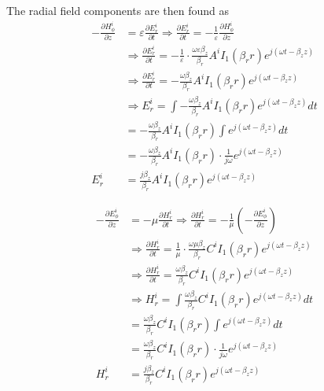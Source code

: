 The radial field components are then found as
\begin{equation}
	\begin{split}
		- \frac{\partial H_\phi^i}{\partial z} &= \varepsilon \frac{\partial E_r^i}{\partial t} 
		\Rightarrow \frac{\partial E_r^i}{\partial t} = -\frac{1}{\varepsilon} \frac{\partial H_\phi^i}{\partial z} \\
		&\Rightarrow \frac{\partial E_r^i}{\partial t} = -\frac{1}{\varepsilon} \cdot \frac{\omega \varepsilon \beta_z}{\beta_r} A^i I_1(\beta_r r) e^{j(\omega t - \beta_z z)} \\
		&\Rightarrow \frac{\partial E_r^i}{\partial t} = -\frac{\omega \beta_z}{\beta_r} A^i I_1(\beta_r r) e^{j(\omega t - \beta_z z)} \\
		&\Rightarrow E_r^i = \int -\frac{\omega \beta_z}{\beta_r} A^i I_1(\beta_r r) e^{j(\omega t - \beta_z z)} dt \\
		&= -\frac{\omega \beta_z}{\beta_r} A^i I_1(\beta_r r) \int e^{j(\omega t - \beta_z z)} dt \\
		&= -\frac{\omega \beta_z}{\beta_r} A^i I_1(\beta_r r) \cdot \frac{1}{j\omega} e^{j(\omega t - \beta_z z)} \\
		E_r^i &= \frac{j \beta_z}{\beta_r} A^i I_1(\beta_r r) e^{j(\omega t - \beta_z z)}
	\end{split}
	\label{eq:Er_i}
\end{equation}

\begin{equation}
	\begin{split}
		- \frac{\partial E_\phi^i}{\partial z} &= -\mu \frac{\partial H_r^i}{\partial t} 
		\Rightarrow \frac{\partial H_r^i}{\partial t} = -\frac{1}{\mu} \left( -\frac{\partial E_\phi^i}{\partial z} \right) \\
		&\Rightarrow \frac{\partial H_r^i}{\partial t} = \frac{1}{\mu} \cdot \frac{\omega \mu \beta_z}{\beta_r} C^i I_1(\beta_r r) e^{j(\omega t - \beta_z z)} \\
		&\Rightarrow \frac{\partial H_r^i}{\partial t} = \frac{\omega \beta_z}{\beta_r} C^i I_1(\beta_r r) e^{j(\omega t - \beta_z z)} \\
		&\Rightarrow H_r^i = \int \frac{\omega \beta_z}{\beta_r} C^i I_1(\beta_r r) e^{j(\omega t - \beta_z z)} dt \\
		&= \frac{\omega \beta_z}{\beta_r} C^i I_1(\beta_r r) \int e^{j(\omega t - \beta_z z)} dt \\
		&= \frac{\omega \beta_z}{\beta_r} C^i I_1(\beta_r r) \cdot \frac{1}{j\omega} e^{j(\omega t - \beta_z z)} \\
		H_r^i &= \frac{j \beta_z}{\beta_r} C^i I_1(\beta_r r) e^{j(\omega t - \beta_z z)}
	\end{split}
	\label{eq:Hr_i}
\end{equation}

